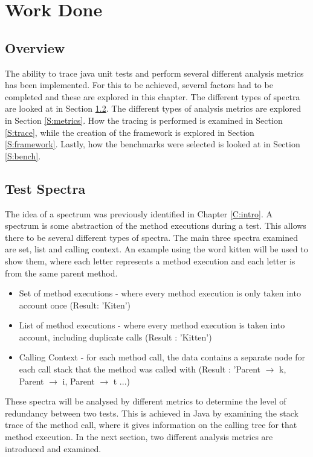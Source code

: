 \chapter{Work Done}\label{C:workdone}

\section{Overview}

The ability to trace java unit tests and perform several different analysis metrics has been implemented. For this to be achieved, several factors had to be completed and these are explored in this chapter. The different types of spectra are looked at in Section \ref{S:spectra}. The different types of analysis metrics are explored in Section \ref{S:metrics}. How the tracing is performed is examined in Section \ref{S:trace}, while the creation of the framework is explored in Section \ref{S:framework}. Lastly, how the benchmarks were selected is looked at in Section \ref{S:bench}.

\section{Test Spectra}
\label{S:spectra}

The idea of a spectrum was previously identified in Chapter \ref{C:intro}. A spectrum is some abstraction of the method executions during a test. This allows there to be several different types of spectra. The main three spectra examined are set, list and calling context. An example using the word kitten will be used to show them, where each letter represents a method execution and each letter is from the same parent method.

\begin{itemize}
\item Set of method executions - where every method execution is only taken into account once (Result: 'Kiten')
\item List of method executions - where every method execution is taken into account, including duplicate calls (Result : 'Kitten')
\item Calling Context - for each method call, the data contains a separate node for each call stack that the method was called with \cite{callingcontext} (Result : 'Parent $\rightarrow$ k, Parent $\rightarrow$ i, Parent $\rightarrow$ t ...) 
\end{itemize}
These spectra will be analysed by different metrics to determine the level of redundancy between two tests. This is achieved in Java by examining the stack trace of the method call, where it gives information on the calling tree for that method execution. In the next section, two different analysis metrics are introduced and examined.

